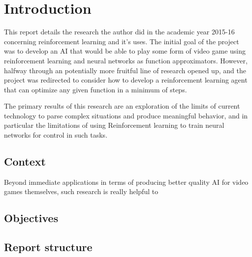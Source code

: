 \section{Introduction}
This report details the research the author did in the academic year 2015-16 concerning reinforcement learning and it's uses. The initial goal of the project was to develop an AI that would be able to play some form of video game using reinforcement learning and neural networks as function approximators. However, halfway through an potentially more fruitful line of research opened up, and the project was redirected to consider how to develop a reinforcement learning agent that can optimize any given function in a minimum of steps.

The primary results of this research are an exploration of the limits of current technology to parse complex situations and produce meaningful behavior, and in particular the limitations of using Reinforcement learning to train neural networks for control in such tasks.

\subsection{Context}
Beyond immediate applications in terms of producing better quality AI for video games themselves, such research is really helpful to 


\subsection{Objectives}

\subsection{Report structure}

